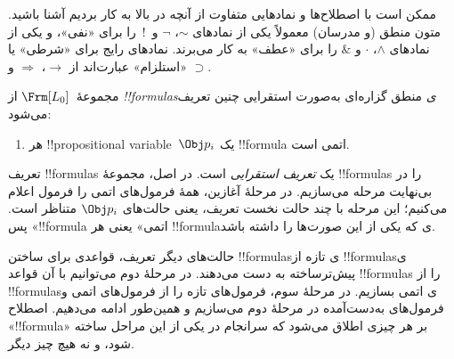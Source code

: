 \documentclass[../../../include/open-logic-section]{subfiles}
\begin{document}

\begin{intro}
ممکن است با اصطلاح‌ها و نمادهایی متفاوت از آنچه در بالا به کار بردیم آشنا
باشید. متون منطق (و مدرسان) معمولاً یکی از نمادهای $\sim$، $\neg$ و~!\ را
برای «نفی»، و یکی از نمادهای $\wedge$، $\cdot$ و $\&$ را برای «عطف» به
کار می‌برند. نمادهای رایج برای «شرطی» یا «استلزام» عبارت‌اند از
$\rightarrow$، $\Rightarrow$ و $\supset$.
\end{intro}

\begin{defn}[فرمول]
مجموعهٔ~$\Frm[L_0]$ از \emph{!!{formula}sی} منطق گزاره‌ای به‌صورت استقرایی
چنین تعریف می‌شود:
\begin{enumerate}


\item هر !!{propositional variable}~$\Obj p_i$ یک !!{formula} اتمی است.






\end{enumerate}
\end{defn}

\begin{explain}
تعریف !!{formula}s یک \emph{تعریف استقرایی} است. در اصل، مجموعهٔ
!!{formula}s را در بی‌نهایت مرحله می‌سازیم. در مرحلهٔ آغازین، همهٔ
فرمول‌های اتمی را فرمول اعلام می‌کنیم؛ این مرحله با چند حالت نخست تعریف،
یعنی حالت‌های
%
%
$\Obj p_i$ متناظر است. پس «!!{formula} اتمی» یعنی هر !!{formula}ی که یکی از
این صورت‌ها را داشته باشد.

حالت‌های دیگر تعریف، قواعدی برای ساختن !!{formula}sی تازه از
!!{formula}sی پیش‌ترساخته به دست می‌دهند. در مرحلهٔ دوم می‌توانیم
با آن قواعد !!{formula}s را از !!{formula}sی اتمی بسازیم. در
مرحلهٔ سوم، فرمول‌های تازه را از فرمول‌های اتمی و فرمول‌های به‌دست‌آمده در
مرحلهٔ دوم می‌سازیم و همین‌طور ادامه می‌دهیم. اصطلاح «!!{formula}» بر هر
چیزی اطلاق می‌شود که سرانجام در یکی از این مراحل ساخته شود، و نه هیچ چیز
دیگر.
\end{explain}
\end{document}
